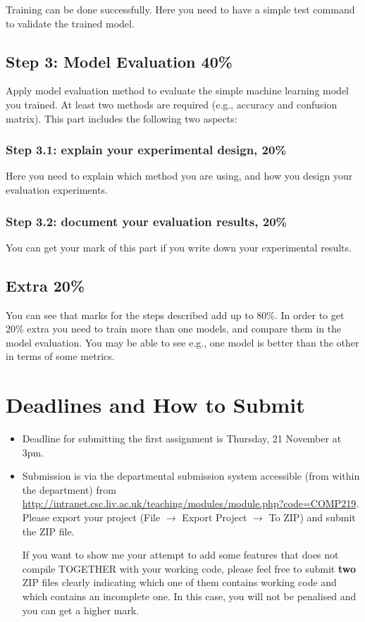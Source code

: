 \documentclass[12pt,a4]{article}
\begin{document}
Training can be done successfully. Here you need to have a simple test command to validate the trained model.  


\subsection*{Step 3: Model Evaluation 40\%}

Apply model evaluation method to evaluate the simple machine learning model you trained. At least two methods are required (e.g., accuracy and confusion matrix). This part includes the following two aspects: 

\subsubsection*{Step 3.1: explain your experimental design, 20\%}

Here you need to explain which method you are using, and how you design your evaluation experiments. 


\subsubsection*{Step 3.2: document your evaluation results, 20\%} 

You can get your mark of this part if you write down your experimental results. 


\subsection*{Extra 20\%}

You can see that marks for the steps described add up to 80\%.  In order to get
20\% extra you need  to train more than one models, and compare them in the model evaluation. You may be able to see e.g., one model is better than the other in terms of some metrics. 

\section{Deadlines and How to Submit}
\begin{itemize}
\item Deadline for submitting the first assignment is Thursday, 21 November at 3pm.

\item Submission is via the departmental submission system accessible
(from within the department) from \\
\url{http://intranet.csc.liv.ac.uk/teaching/modules/module.php?code=COMP219}.\\
Please export your project (File $\rightarrow$ Export Project $\rightarrow$ To ZIP)
and submit the ZIP file.




If you want to show me your attempt to add some features that does not compile 
TOGETHER with your working code, please feel free to submit \textbf{two} ZIP files
clearly indicating which one of them contains working code and which contains
an incomplete one. In this case, you will not be penalised and you can 
get a higher mark. 

\end{itemize}
\end{document}
